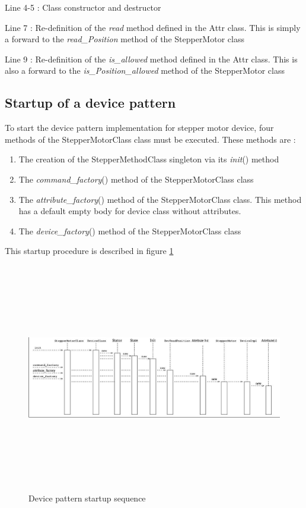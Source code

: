 Line 4-5 : Class constructor and destructor

Line 7 : Re-definition of the \emph{read} method defined in the Attr
class. This is simply a \textquotedbl{}forward\textquotedbl{} to the
\emph{read\_Position} method of the StepperMotor class

Line 9 : Re-definition of the \emph{is\_allowed} method defined in
the Attr class. This is also a \textquotedbl{}forward\textquotedbl{}
to the \emph{is\_Position\_allowed} method of the StepperMotor class


\subsection{Startup of a device pattern\label{Pattern startup}}

To start the device pattern implementation for stepper motor device,
four methods of the StepperMotorClass class must be executed. These
methods are :
\begin{enumerate}
\item The creation of the StepperMethodClass singleton
via its \emph{init}() method
\item The \emph{command\_factory}() method of the
StepperMotorClass class
\item The \emph{attribute\_factory}() method of
the StepperMotorClass class. This method has a default empty body
for device class without attributes.
\item The \emph{device\_factory}() method of the
StepperMotorClass class
\end{enumerate}
This startup procedure is described in figure \ref{pattern_startup_fig}
\begin{figure}
\begin{centering}
\includegraphics[width=14cm,height=10cm]{ds_writing/startup}
\par\end{centering}

\protect\caption{Device pattern startup sequence\label{pattern_startup_fig}}
\end{figure}
